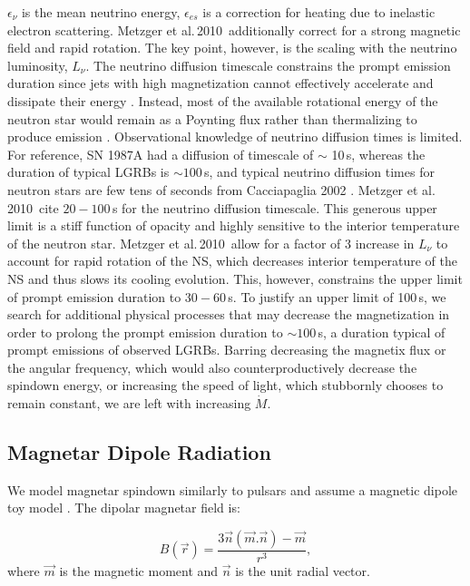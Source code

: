 \documentclass{article}
\begin{document}
$\epsilon_\nu$ is the mean neutrino energy, $\epsilon_{es}$ is a correction for heating due to inelastic electron scattering. Metzger et al.\,2010\,\cite{Metzger:2010pp} additionally  correct for a strong magnetic field and rapid rotation.
The key point, however, is the scaling with the neutrino luminosity, $L_\nu$. The neutrino diffusion timescale constrains the prompt emission duration since jets with high magnetization cannot effectively accelerate and dissipate their energy \cite{Metzger:2010pp}. Instead, most of the available rotational energy of the neutron star would remain as a Poynting flux rather than thermalizing to produce emission \cite{Metzger:2010pp}. Observational knowledge of neutrino diffusion times is limited. For reference, SN 1987A had a diffusion of timescale of $\sim$ 10\,s, whereas the duration of typical LGRBs is $\sim 100$\,s, and typical neutrino diffusion times for neutron stars are few tens of seconds from Cacciapaglia 2002 \cite{Cacciapaglia:2002qr}. Metzger et al.\,2010\,\cite{Metzger:2010pp} cite $20-100$\,s for the neutrino diffusion timescale. This generous upper limit is a stiff function of opacity and highly sensitive to the interior temperature of the neutron star. Metzger et al.\,2010\,\cite{Metzger:2010pp} allow for a factor of 3 increase in $L_\nu$ to account for rapid rotation of the NS, which decreases interior temperature of the NS and thus slows its cooling evolution. This, however, constrains the upper limit of prompt emission duration to $30-60$\,s. To justify an upper limit of 100\,s, we search for additional physical processes that may decrease the magnetization in order to prolong the prompt emission duration to $\sim 100$\,s, a duration typical of prompt emissions of observed LGRBs. Barring decreasing the magnetix flux or the angular frequency, which would also counterproductively decrease the spindown energy, or increasing the speed of light, which stubbornly chooses to remain constant,  we are left with increasing $\dot{M}$. 

\subsection{Magnetar Dipole Radiation} \label{sec:dipole}

We model magnetar spindown similarly to pulsars and assume a magnetic dipole toy model \cite{Rosswog:2007ap}. The dipolar magnetar field is:

\begin{equation} B(\vec{r})=\frac{3\vec{n}(\vec{m}.\vec{n})-\vec{m}}{r^3}, \end{equation}
where $\vec{m}$ is the magnetic moment and $\vec{n}$ is the unit radial vector.
\end{document}
